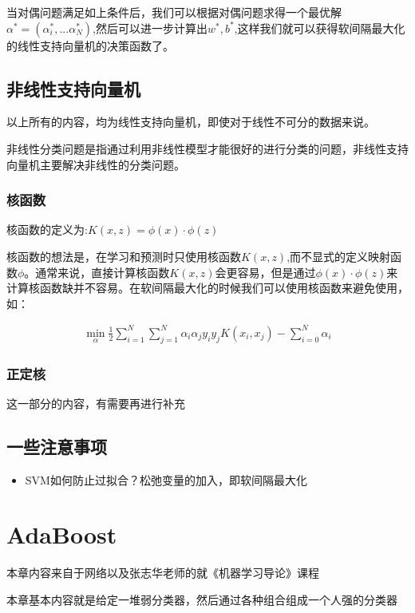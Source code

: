 	当对偶问题满足如上条件后，我们可以根据对偶问题求得一个最优解$\alpha^*=(\alpha_i^*,...\alpha_N^*)$,然后可以进一步计算出$w^*,b^*$,这样我们就可以获得软间隔最大化的线性支持向量机的决策函数了。
	
	
	\subsection{非线性支持向量机}
	以上所有的内容，均为线性支持向量机，即使对于线性不可分的数据来说。
	
	非线性分类问题是指通过利用非线性模型才能很好的进行分类的问题，非线性支持向量机主要解决非线性的分类问题。
	
	\subsubsection{核函数}
	核函数的定义为:$K(x,z)=\phi(x)\cdot\phi(z)$
	
	核函数的想法是，在学习和预测时只使用核函数$K(x,z)$,而不显式的定义映射函数$\phi$。通常来说，直接计算核函数$K(x,z)$会更容易，但是通过$\phi(x)\cdot\phi(z)$来计算核函数缺并不容易。在软间隔最大化的时候我们可以使用核函数来避免使用，如：
	
	\begin{gather}
	\min_{\alpha} \frac{1}{2}\sum_{i=1}^{N}\sum_{j=1}^{N}\alpha_i \alpha_j y_i y_j K(x_i,x_j) - \sum_{i=0}^{N} \alpha_i
	\end{gather}
	
	\subsubsection{正定核}
	这一部分的内容，有需要再进行补充
	
	
	
	\subsection{一些注意事项}
	\begin{itemize}
		\item SVM如何防止过拟合？松弛变量的加入，即软间隔最大化
	\end{itemize}
	



\section{AdaBoost}
	本章内容来自于网络以及张志华老师的就《机器学习导论》课程

	本章基本内容就是给定一堆弱分类器，然后通过各种组合组成一个人强的分类器
